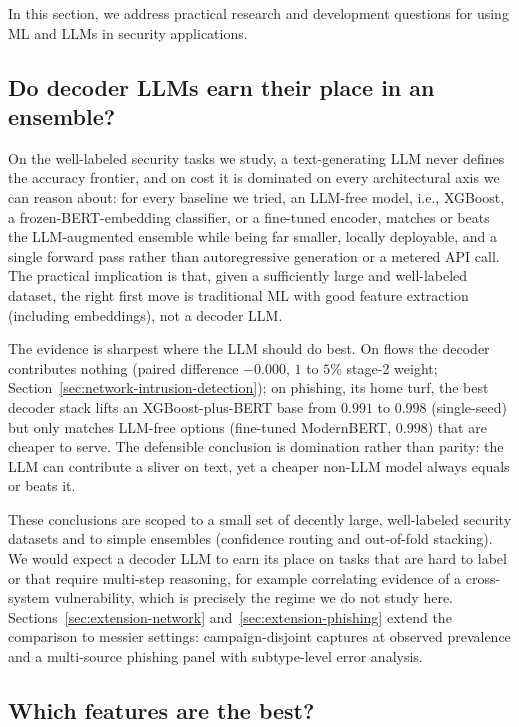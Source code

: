 \documentclass{jmlr}
\begin{document}
In this section, we address practical research and development questions for using ML and LLMs in security applications.

\subsection{Do decoder LLMs earn their place in an ensemble?}
\label{sec:llm-ensemble-value}

\noindent On the well-labeled security tasks we study, a text-generating LLM never defines the accuracy frontier, and on cost it is dominated on every architectural axis we can reason about: for every baseline we tried, an LLM-free model, i.e., XGBoost, a frozen-BERT-embedding classifier, or a fine-tuned encoder, matches or beats the LLM-augmented ensemble while being far smaller, locally deployable, and a single forward pass rather than autoregressive generation or a metered API call. The practical implication is that, given a sufficiently large and well-labeled dataset, the right first move is traditional ML with good feature extraction (including embeddings), not a decoder LLM.

The evidence is sharpest where the LLM should do best. On flows the decoder contributes nothing (paired difference $-0.000$, $1$ to $5\%$ stage-2 weight; Section~\ref{sec:network-intrusion-detection}); on phishing, its home turf, the best decoder stack lifts an XGBoost-plus-BERT base from $0.991$ to $0.998$ (single-seed) but only matches LLM-free options (fine-tuned ModernBERT, $0.998$) that are cheaper to serve. The defensible conclusion is domination rather than parity: the LLM can contribute a sliver on text, yet a cheaper non-LLM model always equals or beats it.

These conclusions are scoped to a small set of decently large, well-labeled security datasets and to simple ensembles (confidence routing and out-of-fold stacking). We would expect a decoder LLM to earn its place on tasks that are hard to label or that require multi-step reasoning, for example correlating evidence of a cross-system vulnerability, which is precisely the regime we do not study here. Sections~\ref{sec:extension-network} and~\ref{sec:extension-phishing} extend the comparison to messier settings: campaign-disjoint captures at observed prevalence and a multi-source phishing panel with subtype-level error analysis.

\subsection{Which features are the best?}
\label{sec:which-features-best} 
\end{document}

